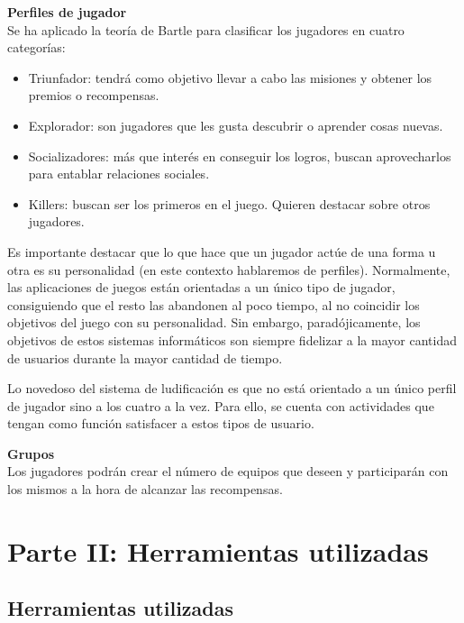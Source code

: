 \documentclass[twoside]{report}
\begin{document}
\textbf{Perfiles de jugador\cite{iebsctj}}\\ 

Se ha aplicado la teoría de Bartle para clasificar los jugadores en cuatro categorías:
\begin{itemize}

\item Triunfador: tendrá como objetivo llevar a cabo las misiones y obtener los premios o recompensas.
\item Explorador: son jugadores que les gusta descubrir o aprender cosas nuevas.
\item Socializadores: más que interés en conseguir los logros, buscan aprovecharlos para entablar relaciones sociales.
\item Killers: buscan ser los primeros en el juego. Quieren destacar sobre otros jugadores.

\end{itemize}

Es importante destacar que lo que hace que un jugador actúe de una forma u otra es su personalidad (en este contexto hablaremos de perfiles). Normalmente, las aplicaciones de juegos están orientadas a un único tipo de jugador, consiguiendo que el resto las abandonen al poco tiempo, al no coincidir los objetivos del juego con su personalidad. Sin embargo, paradójicamente, los objetivos de estos sistemas informáticos son siempre fidelizar a la mayor cantidad de usuarios durante la mayor cantidad de tiempo.

Lo novedoso del sistema de ludificación es que no está orientado a un único perfil de jugador sino a los cuatro a la vez. Para ello, se cuenta con actividades que tengan como función satisfacer a estos tipos de usuario. 


\textbf{Grupos}\\

Los jugadores podrán crear el número de equipos que deseen y participarán con los mismos a la hora de alcanzar las recompensas.

\chapter{Parte II: Herramientas utilizadas}
\section{Herramientas utilizadas}
\end{document}
